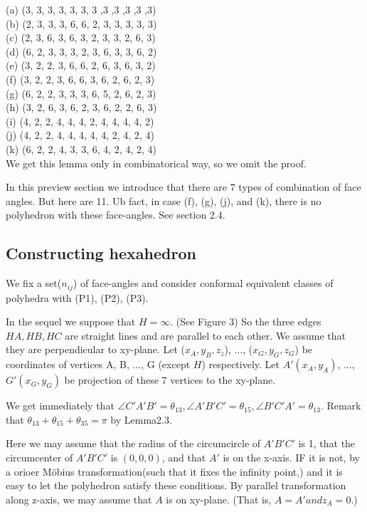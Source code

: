 \documentclass[dvipdfmx]{interact}
\theoremstyle{plain}%
\theoremstyle{definition}
\theoremstyle{remark}
\theoremstyle{problemstyle}
\begin{document}
\noindent(a) (3, 3, 3, 3, 3, 3, 3 ,3 ,3 ,3 ,3 ,3)\\
(b) (2, 3, 3, 3, 6, 6, 2, 3, 3, 3, 3, 3)\\
(c) (2, 3, 6, 3, 6, 3, 2, 3, 3, 2, 6, 3)\\
(d) (6, 2, 3, 3, 3, 2, 3, 6, 3, 3, 6, 2)\\
(e) (3, 2, 2, 3, 6, 6, 2, 6, 3, 6, 3, 2)\\
(f) (3, 2, 2, 3, 6, 6, 3, 6, 2, 6, 2, 3)\\
(g) (6, 2, 2, 3, 3, 3, 6, 5, 2, 6, 2, 3)\\
(h) (3, 2, 6, 3, 6, 2, 3, 6, 2, 2, 6, 3)\\
(i) (4, 2, 2, 4, 4, 4, 2, 4, 4, 4, 4, 2)\\
(j) (4, 2, 2, 4, 4, 4, 4, 4, 2, 4, 2, 4)\\
(k) (6, 2, 2, 4, 3, 3, 6, 4, 2, 4, 2, 4)\\


We get this lemma only in combinatorical way, so we omit the proof.

In this preview section we introduce that there are 7 types of
combination of face angles. But here are 11. Ub fact, in case (f), (g),
(j), and (k), there is no polyhedron with these face-angles. See section 2.4.

\subsection{Constructing hexahedron}

We fix a set($n_{ij}$) of face-angles and consider conformal equivalent
classes of polyhedra with (P1), (P2), (P3).

In the sequel we suppose that $H = \infty$. (See Figure 3) So the three
edges $HA, HB, HC$ are straight lines and are parallel to each other. We
assume that they are perpendicular to xy-plane.
Let ($x_A, y_B, z_z$), ..., ($x_G, y_G, z_G$) be coordinates of vertices
A, B, ..., G (except $H$) respectively. Let $A'(x_A, y_A)$, ...,$G'(x_G,
y_G)$ be projection of these 7 vertices to the xy-plane.

We get immediately that $\angle C'A'B' = \theta_{13}, \angle A'B'C' =
\theta_{15}, \angle B'C'A'=\theta_{13}$. Remark that $\theta_{13} +
\theta_{15} + \theta_{35} = \pi$ by Lemma2.3.

Here we may assume that the radius of the circumcircle of $A'B'C'$ is 1,
that the circumcenter of $A'B'C'$ is $(0, 0, 0)$, and that $A'$ is on
the x-axis. IF it is not, by a orioer M\"obius transformation(such that
it fixes the infinity point,) and it is easy to let the polyhedron
satisfy these conditions. By parallel transformation along z-axis, we
may assume that $A$ is on xy-plane. (That is, $A = A' and z_A = 0.$)
\end{document}
